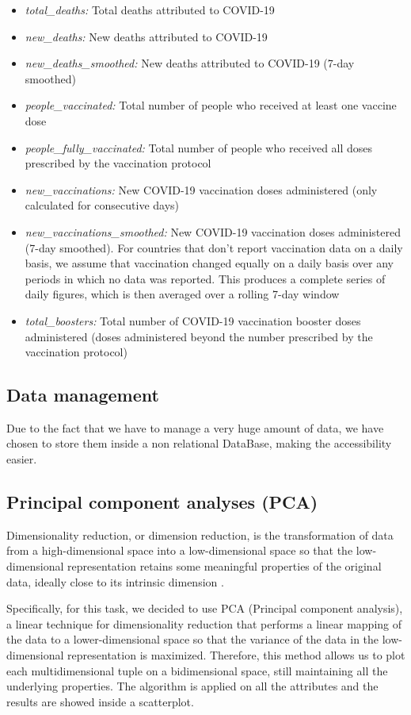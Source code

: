 \documentclass[10pt,conference]{IEEEtran}
\begin{document}
\begin{itemize}
		\item \emph{total\_deaths:} Total deaths attributed to COVID-19
		\item \emph{new\_deaths:} New deaths attributed to COVID-19
		\item \emph{new\_deaths\_smoothed:} New deaths attributed to COVID-19 (7-day smoothed)

		\item \emph{people\_vaccinated:} Total number of people who received at least one vaccine dose
		\item \emph{people\_fully\_vaccinated:} Total number of people who received all doses prescribed by the vaccination protocol
		\item \emph{new\_vaccinations:} New COVID-19 vaccination doses administered (only calculated for consecutive days)
		\item \emph{new\_vaccinations\_smoothed:} New COVID-19 vaccination doses administered (7-day smoothed). For countries that don't report vaccination data on a daily basis, we assume that vaccination changed equally on a daily basis over any periods in which no data was reported. This produces a complete series of daily figures, which is then averaged over a rolling 7-day window
		\item \emph{total\_boosters:} Total number of COVID-19 vaccination booster doses administered (doses administered beyond the number prescribed by the vaccination protocol)

	\end{itemize}

\subsection{Data management}
Due to the fact that we have to manage a very huge amount of data, we have chosen to store them inside a non relational DataBase, making the accessibility easier.

\subsection{Principal component analyses (PCA)}
Dimensionality reduction, or dimension reduction, is the transformation of data from a high-dimensional space into a low-dimensional space so that the low-dimensional representation retains some meaningful properties of the original data, ideally close to its intrinsic dimension \cite{dimRed}.

Specifically, for this task, we decided to use PCA (Principal component analysis), a linear technique for dimensionality reduction that performs a linear mapping of the data to a lower-dimensional space so that the variance of the data in the low-dimensional representation is maximized.
Therefore, this method allows us to plot each multidimensional tuple on a bidimensional space, still maintaining all the underlying properties. 
The algorithm is applied on all the attributes and the results are showed inside a scatterplot.
\end{document}
